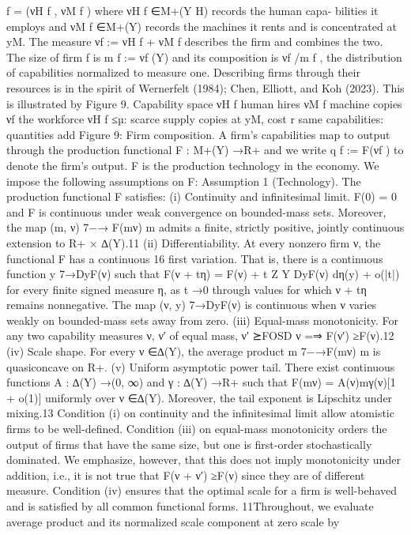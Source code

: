 f = (νH
f , νM
f )
where νH
f ∈M+(Y H) records the human capa-
bilities it employs and νM
f
∈M+(Y) records
the machines it rents and is concentrated at
yM. The measure νf := νH
f + νM
f describes the
firm and combines the two. The size of firm
f is m f := νf (Y) and its composition is νf /m f ,
the distribution of capabilities normalized to
measure one. Describing firms through their
resources is in the spirit of Wernerfelt (1984);
Chen, Elliott, and Koh (2023). This is illustrated
by Figure 9.
Capability space
νH
f
human hires
νM
f
machine copies
νf
the workforce
νH
f ≤µ: scarce supply
copies at yM, cost r
same capabilities:
quantities add
Figure 9: Firm composition.
A firm’s capabilities map to output through the production functional
F : M+(Y) →R+
and we write q f := F(νf ) to denote the firm’s output. F is the production technology
in the economy. We impose the following assumptions on F:
Assumption 1 (Technology). The production functional F satisfies:
(i) Continuity and infinitesimal limit. F(0) = 0 and F is continuous under
weak convergence on bounded-mass sets. Moreover, the map (m, ν) 7−→
F(mν)
m
admits a finite, strictly positive, jointly continuous extension to R+ ×
∆(Y).11
(ii) Differentiability. At every nonzero firm ν, the functional F has a continuous
16
first variation. That is, there is a continuous function y 7→DyF(ν) such that
F(ν + tη) = F(ν) + t
Z
Y DyF(ν) dη(y) + o(|t|)
for every finite signed measure η, as t →0 through values for which ν + tη
remains nonnegative. The map (ν, y) 7→DyF(ν) is continuous when ν varies
weakly on bounded-mass sets away from zero.
(iii) Equal-mass monotonicity. For any two capability measures ν, ν′ of equal
mass,
ν′ ⪰FOSD ν
=⇒
F(ν′) ≥F(ν).12
(iv) Scale shape. For every ν ∈∆(Y), the average product
m 7−→F(mν)
m
is quasiconcave on R+.
(v) Uniform asymptotic power tail.
There exist continuous functions A :
∆(Y) →(0, ∞) and γ : ∆(Y) →R+ such that
F(mν) = A(ν)mγ(ν)[1 + o(1)]
uniformly over ν ∈∆(Y). Moreover, the tail exponent is Lipschitz under
mixing.13
Condition (i) on continuity and the infinitesimal limit allow atomistic firms to be
well-defined. Condition (iii) on equal-mass monotonicity orders the output of firms
that have the same size, but one is first-order stochastically dominated. We emphasize,
however, that this does not imply monotonicity under addition, i.e., it is not true that
F(ν + ν′) ≥F(ν) since they are of different measure. Condition (iv) ensures that the
optimal scale for a firm is well-behaved and is satisfied by all common functional forms.
11Throughout, we evaluate average product and its normalized scale component at zero scale by
